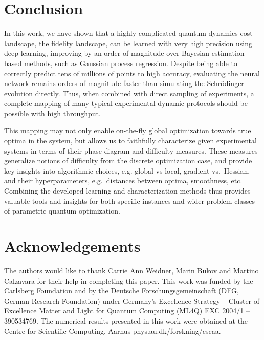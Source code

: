 \documentclass[aps, twocolumn,superscriptaddress]{revtex4-1}
\begin{document}

\section{Conclusion} \label{sec:conclusion}

In this work, we have shown that a highly complicated quantum dynamics cost landscape, the fidelity landscape, can be learned with very high precision using deep learning, improving by an order of magnitude over Bayesian estimation based methods, such as Gaussian process regression. Despite being able to correctly predict tens of millions of points to high accuracy, evaluating the neural network remains orders of magnitude faster than simulating the Schrödinger evolution directly. Thus, when combined with direct sampling of experiments, a complete mapping of many typical experimental dynamic protocols should be possible with high throughput. 

This mapping may not only enable on-the-fly global optimization towards true optima in the system, but allows us to faithfully characterize given experimental systems in terms of their phase diagram and difficulty measures.  These measures generalize notions of difficulty from the discrete optimization case, and provide key insights into algorithmic choices, e.g. global vs local, gradient vs.~Hessian, and their hyperparameters, e.g.~distances between optima, smoothness, etc. Combining the developed learning and characterization methods  thus provides valuable tools and insights for both specific instances and wider problem classes of parametric quantum optimization.

\section{Acknowledgements}
The authors would like to thank Carrie Ann Weidner, Marin Bukov and Martino Calzavara for their help in completing this paper.
This work was funded by the Carlsberg Foundation and by the Deutsche Forschungsgemeinschaft (DFG, German Research Foundation) under Germany's Excellence Strategy – Cluster of Excellence Matter and Light for Quantum Computing (ML4Q) EXC 2004/1 – 390534769.  The  numerical  results  presented  in  this  work were  obtained  at  the  Centre for  Scientific  Computing, Aarhus phys.au.dk/forskning/cscaa.
\end{document}
